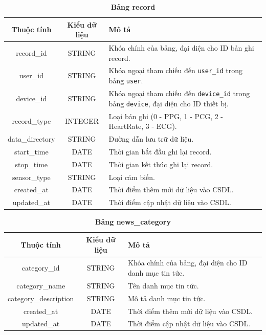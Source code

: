 \begin{table}[H]
  \caption{\bfseries \fontsize{12pt}{0pt}\selectfont Bảng record}
  \centering
  \begin{tabularx}{0.9\textwidth}{|c|c|X|}
    \hline
    \textbf{Thuộc tính} & \textbf{Kiểu dữ liệu} & \textbf{Mô tả} \\
    \hline
    record\_id & STRING & Khóa chính của bảng, đại diện cho ID bản ghi record. \\
    \hline
    user\_id & STRING & Khóa ngoại tham chiếu đến \texttt{user\_id} trong bảng \texttt{user}. \\
    \hline
    device\_id & STRING & Khóa ngoại tham chiếu đến \texttt{device\_id} trong bảng \texttt{device}, đại diện cho ID thiết bị. \\
    \hline
    record\_type & INTEGER & Loại bản ghi (0 - PPG, 1 - PCG, 2 - HeartRate, 3 - ECG). \\
    \hline
    data\_directory & STRING & Đường dẫn lưu trữ dữ liệu. \\
    \hline
    start\_time & DATE & Thời gian bắt đầu ghi lại record. \\
    \hline
    stop\_time & DATE & Thời gian kết thúc ghi lại record. \\
    \hline
    sensor\_type & STRING & Loại cảm biến. \\
    \hline
    created\_at & DATE & Thời điểm thêm mới dữ liệu vào CSDL. \\
    \hline
    updated\_at & DATE & Thời điểm cập nhật dữ liệu vào CSDL. \\
    \hline
  \end{tabularx}
\end{table}

\begin{table}[H]
  \caption{\bfseries \fontsize{12pt}{0pt}\selectfont Bảng news\_category}
  \centering
  \begin{tabularx}{0.9\textwidth}{|c|c|X|}
    \hline
    \textbf{Thuộc tính} & \textbf{Kiểu dữ liệu} & \textbf{Mô tả} \\
    \hline
    category\_id & STRING & Khóa chính của bảng, đại diện cho ID danh mục tin tức. \\
    \hline
    category\_name & STRING & Tên danh mục tin tức. \\
    \hline
    category\_description & STRING & Mô tả danh mục tin tức. \\
    \hline
    created\_at & DATE & Thời điểm thêm mới dữ liệu vào CSDL. \\
    \hline
    updated\_at & DATE & Thời điểm cập nhật dữ liệu vào CSDL. \\
    \hline
  \end{tabularx}
\end{table}

